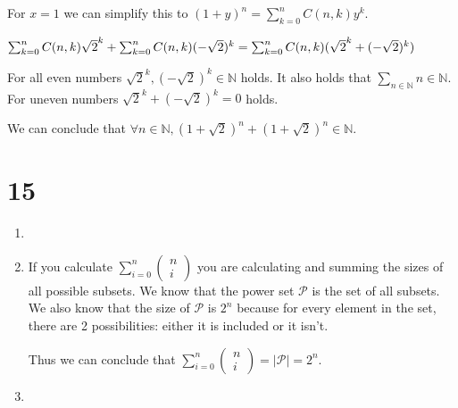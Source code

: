 \documentclass[12pt]{article}
\begin{document}
For $x = 1$ we can simplify this to $(1 + y)^n = \sum_{k = 0}^{n} C(n, k) y^k$.

$\sum_{k = 0}^{n} C(n, k) \sqrt{2}^k + \sum_{k = 0}^{n} C(n, k) (-\sqrt{2})^k\\
=\sum_{k = 0}^{n} C(n, k)(\sqrt{2}^k + (-\sqrt{2})^k)$


For all even numbers $\sqrt{2}^k, (-\sqrt{2})^k \in \mathbb{N}$ holds. It also holds that $\sum_{n \in \mathbb{N}} n \in \mathbb{N}$.\\
For uneven numbers $\sqrt{2}^k + (-\sqrt{2})^k = 0$ holds.

We can conclude that $\forall n \in \mathbb{N}, (1 + \sqrt{2})^n + (1 + \sqrt{2})^n \in \mathbb{N}$.

\section*{15}
\begin{enumerate}[a]
	\item %
	\item %
	If you calculate $\sum_{i = 0}^{n} \begin{pmatrix}
		n \\ i
	\end{pmatrix}$ you are calculating and summing the sizes of all possible subsets. We know that the power set $\mathcal{P}$ is the set of all subsets. We also know that the size of $\mathcal{P}$ is $2^n$ because for every element in the set, there are 2 possibilities: either it is included or it isn't.

	Thus we can conclude that $\sum_{i = 0}^{n} \begin{pmatrix}
		n \\ i
	\end{pmatrix} = | \mathcal{P} | = 2^n$.
	\item %
\end{enumerate}
\end{document}
